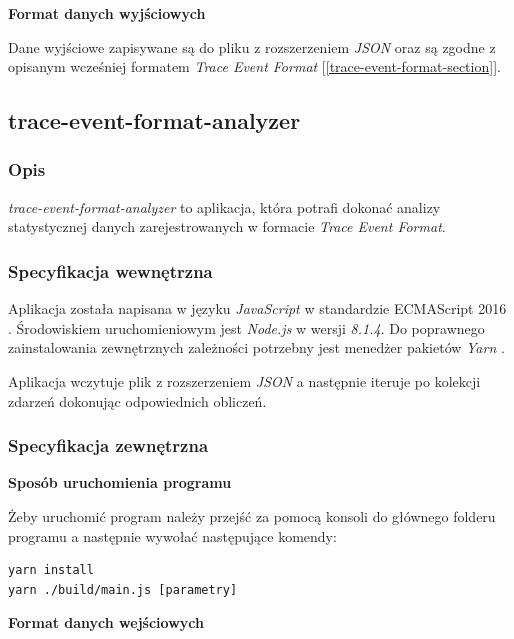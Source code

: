 \documentclass[polish, twoside, 12pt]{mwart}
\begin{document}
\textbf{Format danych wyjściowych} \newline

Dane wyjściowe zapisywane są do pliku z rozszerzeniem \emph{JSON} oraz są zgodne z opisanym wcześniej formatem \emph
{Trace Event Format} [\ref{trace-event-format-section}].

\subsection{trace-event-format-analyzer}

\subsubsection{Opis}

\emph{trace-event-format-analyzer} to aplikacja, która potrafi dokonać analizy statystycznej danych zarejestrowanych w formacie \emph{Trace Event Format}.

\subsubsection{Specyfikacja wewnętrzna}

Aplikacja została napisana w języku \emph{JavaScript} w standardzie ECMAScript 2016 \cite{es2016}. Środowiskiem uruchomieniowym jest \emph{Node.js} \cite{node.js} w wersji \emph{8.1.4}. Do poprawnego zainstalowania zewnętrznych zależności potrzebny jest menedżer pakietów \emph{Yarn} \cite{yarn}.

Aplikacja wczytuje plik z rozszerzeniem \emph{JSON} a następnie iteruje po kolekcji zdarzeń dokonując odpowiednich obliczeń.

\subsubsection{Specyfikacja zewnętrzna}

\textbf{Sposób uruchomienia programu} \newline

Żeby uruchomić program należy przejść za pomocą konsoli do głównego folderu programu a następnie wywołać następujące komendy:

\begin{lstlisting}
yarn install
yarn ./build/main.js [parametry]
\end{lstlisting}

\textbf{Format danych wejściowych} \newline
\end{document}
